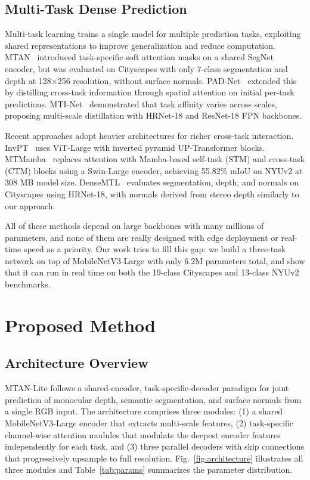 \documentclass[journal, onecolumn]{IEEEtran}
\begin{document}
\subsection{Multi-Task Dense Prediction}

Multi-task learning trains a single model for multiple prediction tasks, exploiting shared representations to improve generalization and reduce computation. MTAN~\cite{liu2019mtan} introduced task-specific soft attention masks on a shared SegNet encoder, but was evaluated on Cityscapes with only 7-class segmentation and depth at 128$\times$256 resolution, without surface normals. PAD-Net~\cite{xu2018padnet} extended this by distilling cross-task information through spatial attention on initial per-task predictions. MTI-Net~\cite{vandenhende2020mti} demonstrated that task affinity varies across scales, proposing multi-scale distillation with HRNet-18 and ResNet-18 FPN backbones.

Recent approaches adopt heavier architectures for richer cross-task interaction. InvPT~\cite{ye2022invpt} uses ViT-Large with inverted pyramid UP-Transformer blocks. MTMamba~\cite{lin2024mtmamba} replaces attention with Mamba-based self-task (STM) and cross-task (CTM) blocks using a Swin-Large encoder, achieving 55.82\% mIoU on NYUv2 at 308 MB model size. DenseMTL~\cite{lopes2023densemtl} evaluates segmentation, depth, and normals on Cityscapes using HRNet-18, with normals derived from stereo depth similarly to our approach.

All of these methods depend on large backbones with many millions of parameters, and none of them are really designed with edge deployment or real-time speed as a priority. Our work tries to fill this gap: we build a three-task network on top of MobileNetV3-Large with only 6.2M parameters total, and show that it can run in real time on both the 19-class Cityscapes and 13-class NYUv2 benchmarks.

\section{Proposed Method}

\subsection{Architecture Overview}

MTAN-Lite follows a shared-encoder, task-specific-decoder paradigm for joint prediction of monocular depth, semantic segmentation, and surface normals from a single RGB input. The architecture comprises three modules: (1) a shared MobileNetV3-Large encoder that extracts multi-scale features, (2) task-specific channel-wise attention modules that modulate the deepest encoder features independently for each task, and (3) three parallel decoders with skip connections that progressively upsample to full resolution. Fig.~\ref{fig:architecture} illustrates all three modules and Table~\ref{tab:params} summarizes the parameter distribution.
\end{document}
